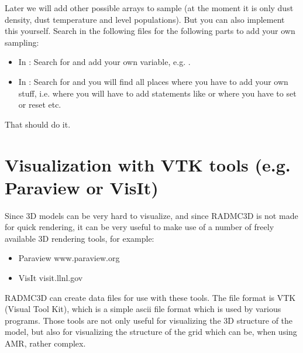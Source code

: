 \documentclass[letterpaper,10pt,english]{sphinxmanual}
\begin{document}
Later we will add other possible arrays to sample (at the moment it is only
dust density, dust temperature and level populations). But you can also
implement this yourself. Search in the following files for the following
parts to add your own sampling:
\begin{itemize}
\item {} 
In : Search for  and add your
own variable, e.g. .

\item {} 
In : Search for  and you will find all
places where you have to add your own stuff, i.e.  where you will have to add
statements like  or where you have to set
 or reset  etc.

\end{itemize}

That should do it.


\chapter{Visualization with VTK tools (e.g. Paraview or VisIt)}
\label{\detokenize{vtkoutput:visualization-with-vtk-tools-e-g-paraview-or-visit}}\label{\detokenize{vtkoutput:chap-vtk-output}}\label{\detokenize{vtkoutput::doc}}
Since 3\sphinxhyphen{}D models can be very hard to visualize, and since RADMC\sphinxhyphen{}3D is not
made for quick rendering, it can be very useful to make use of a number of
freely available 3\sphinxhyphen{}D rendering tools, for example:
\begin{itemize}
\item {} 
Paraview www.paraview.org

\item {} 
VisIt visit.llnl.gov

\end{itemize}

RADMC\sphinxhyphen{}3D can create data files for use with these tools. The file format is
VTK (Visual Tool Kit), which is a simple ascii file format which is used by
various programs. Those tools are not only useful for visualizing the
3\sphinxhyphen{}D structure of the model, but also for visualizing the structure of the
grid which can be, when using AMR, rather complex.
\end{document}

